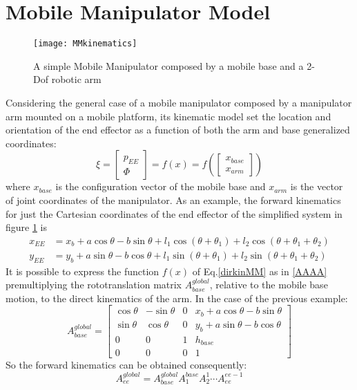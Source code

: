 \section{Mobile Manipulator Model}
\begin{figure}
\centering
\texttt{[image: MMkinematics]}
\caption{A simple Mobile Manipulator composed by a mobile base and a 2-Dof robotic arm}
\label{fig:MMkinematics}
\end{figure}
Considering the general case of a mobile manipulator composed by a manipulator arm mounted on a mobile platform, its kinematic model set the location and orientation of the end effector as a function of both the arm and base generalized coordinates:
\begin{equation}\label{dirkinMM}
	\xi=\left[\begin{matrix}p_{EE}\\\Phi\end{matrix}\right]=f(x)=f\left(\left[\begin{matrix}x_{base}\\x_{arm} \end{matrix}\right]\right)
\end{equation}
where $x_{base}$ is the configuration vector of the mobile base and $x_{arm}$ is the vector of joint coordinates of the manipulator.
As an example, the forward kinematics for just the Cartesian coordinates of the end effector of the simplified system in figure \ref{fig:MMkinematics} is
\begin{equation*}
\begin{split}
	x_{EE}&=x_b+a\cos\theta-b\sin\theta+l_1\cos\left(\theta+\theta_1\right)+l_2\cos\left(\theta+\theta_1+\theta_2\right)\\
	y_{EE}&=y_b+a\sin\theta-b\cos\theta+l_1\sin\left(\theta+\theta_1\right)+l_2\sin\left(\theta+\theta_1+\theta_2\right)
\end{split}
\end{equation*}
It is possible to express the function $f(x)$ of Eq.\ref{dirkinMM} as in \ref{AAAA} premultiplying the rototranslation matrix $A_{base}^{global}$, relative to the mobile base motion, to the direct kinematics of the arm. In the case of the previous example:
\begin{equation}
	A_{base}^{global}=\left[\begin{matrix}
		\cos\theta&-\sin\theta&0&x_b+a\cos\theta-b\sin\theta\\
		\sin\theta&\cos\theta&0&y_b+a\sin\theta-b\cos\theta\\
		0&0&1&h_{base}\\
		0&0&0&1
	\end{matrix}\right]
\end{equation}
So the forward kinematics can be obtained consequently:
\begin{equation}\label{AAAA}
A_{ee}^{global}=A_{base}^{global}A_1^{base}A_2^1\cdots A_{ee}^{ee-1}
\end{equation}

